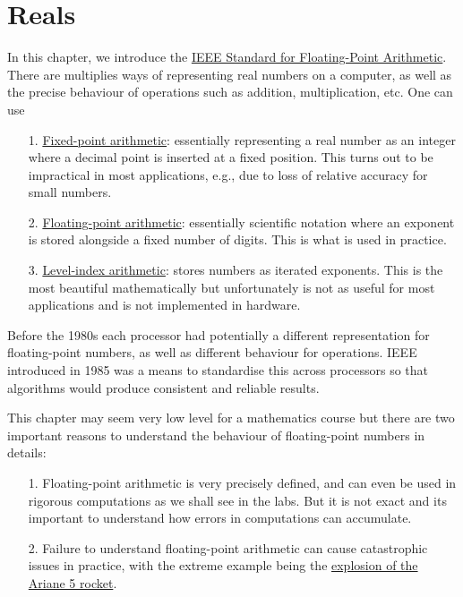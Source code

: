 
\section{Reals}
In this chapter, we introduce  the  \href{https://en.wikipedia.org/wiki/IEEE_754}{IEEE Standard for Floating-Point Arithmetic}. There are multiplies ways of representing real numbers on a computer, as well as  the precise behaviour of operations such as addition, multiplication, etc. One can use

\begin{itemize}
\item[1. ] \href{https://en.wikipedia.org/wiki/Fixed-point_arithmetic}{Fixed-point arithmetic}: essentially representing a real number as an integer where a decimal point is inserted at a fixed position. This turns out to be impractical in most applications, e.g., due to loss of relative accuracy for small numbers.


\item[2. ] \href{https://en.wikipedia.org/wiki/Floating-point_arithmetic}{Floating-point arithmetic}: essentially scientific notation where an exponent is stored alongside a fixed number of digits. This is what is used in practice.


\item[3. ] \href{https://en.wikipedia.org/wiki/Symmetric_level-index_arithmetic}{Level-index arithmetic}: stores numbers as iterated exponents. This is the most beautiful mathematically but unfortunately is not as useful for most applications and is not implemented in hardware.

\end{itemize}
Before the 1980s each processor had potentially a different representation for  floating-point numbers, as well as different behaviour for operations.  IEEE introduced in 1985 was a means to standardise this across processors so that algorithms would produce consistent and reliable results.

This chapter may seem very low level for a mathematics course but there are two important reasons to understand the behaviour of floating-point numbers in details:

\begin{itemize}
\item[1. ] Floating-point arithmetic is very precisely defined, and can even be used in rigorous computations as we shall see in the labs. But it is not exact and its important to understand how errors in computations can accumulate.


\item[2. ] Failure to understand floating-point arithmetic can cause catastrophic issues in practice, with the extreme example being the  \href{https://youtu.be/N6PWATvLQCY?t=86}{explosion of the Ariane 5 rocket}.

\end{itemize}
